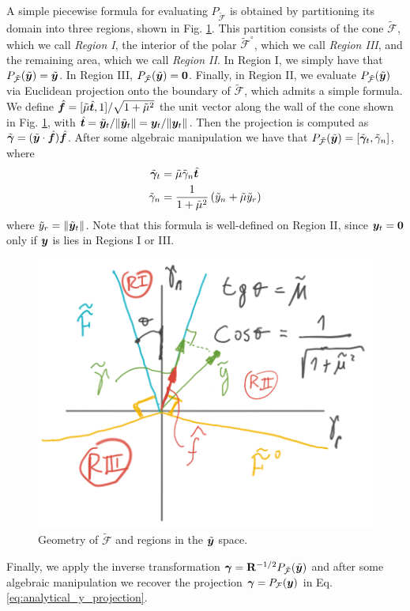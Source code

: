 A simple piecewise formula for evaluating $P_{\tilde{\mathcal{F}}}$ is obtained
by partitioning its domain  into three regions, shown in Fig. \ref{fig:cone_regions}. This partition consists of the
cone $\tilde{\mathcal{F}}$, which we call \textit{Region I}, the interior of the
polar $\tilde{\mathcal{F}}^\circ$, which we call \textit{Region III}, and the
remaining area, which we call \textit{Region II}. In Region I, we simply have
that $P_{\tilde{\mathcal{F}}}(\tilde{{\bm{y}}}) = \tilde{{\bm{y}}}$. In Region III,
$P_{\tilde{\mathcal{F}}}(\tilde{{\bm{y}}}) = {\bm{0}}$. Finally, in Region II, we
evaluate $P_{\tilde{\mathcal{F}}}(\tilde{{\bm{y}}})$ via Euclidean projection onto
the boundary of $\tilde{\mathcal{F}}$, which admits a simple formula. We define
$\hat{{\bm{f}}}=[\tilde{\mu}\hat{{\bm{t}}}, 1]/\sqrt{1+\tilde{\mu}^2}$ the unit
vector along the wall of the cone shown in Fig. \ref{fig:cone_regions}, with
$\hat{{\bm{t}}}=\tilde{{\bm{y}}}_t/\Vert\tilde{{\bm{y}}}_t\Vert={\bm{y}}_t/\Vert{\bm{y}}_t\Vert$. Then the projection is computed as
$\tilde{{\bm\gamma}}=(\tilde{{\bm{y}}}\cdot\hat{{\bm{f}}})\hat{{\bm{f}}}$. After some algebraic manipulation we have that 
$P_{\tilde{\mathcal{F}}}(\tilde{{\bm{y}}}) = [\tilde{{\bm\gamma}}_t, \tilde{\gamma}_n]$,
where
\begin{align}\label{eq:ProjectionFormula}
\begin{aligned}
  \tilde{\bgamma}_t       &= \tilde{\mu}\tilde{\gamma}_n\hat{\vf{t}}\\
        \tilde{\gamma}_n  &= \frac{1}{1+\tilde{\mu}^2}\left(\tilde{y}_n +
	\tilde{\mu}\tilde{y}_r\right)
\end{aligned}
\end{align}
where $\tilde{y}_r=\Vert\tilde{{\bm{y}}}_t\Vert$. Note that this formula is
well-defined on Region II, since ${\bm{y}}_t = {\bm{0}}$ only if ${\bm{y}}$ is lies in
Regions I or III.
\begin{figure}[!h]
    \centering
    \includegraphics[width=0.45\columnwidth]{figures/cone_regions.png}
    \caption{Geometry of $\tilde{\mathcal{F}}$ and regions in the
    $\tilde{{\bm{y}}}$ space.}
    \label{fig:cone_regions}
\end{figure}

Finally, we apply the inverse transformation
${\bm\gamma}={\mathbf{R}}^{-1/2}P_{\tilde{\mathcal{F}}}(\tilde{{\bm{y}}})$ and after some
algebraic manipulation we recover the projection ${\bm\gamma} =
P_\mathcal{F}({\bm{y}})$ in Eq. \eqref{eq:analytical_y_projection}.


